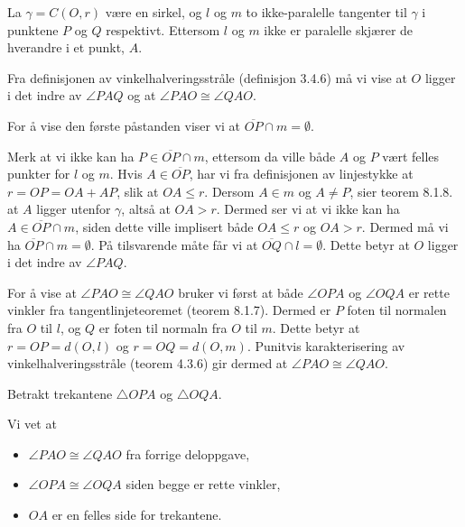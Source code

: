 \begin{oppgave}[8.1.6]
    La $\gamma=C(O,r)$ være en sirkel, og $l$ og $m$ to ikke-paralelle tangenter til $\gamma$ i punktene $P$ og $Q$ respektivt. 
    Ettersom $l$ og $m$ ikke er paralelle skjærer de hverandre i et punkt, $A$. 

    \begin{punkt}
        Fra definisjonen av vinkelhalveringsstråle (definisjon 3.4.6) må vi vise at $O$ ligger i det indre av $\angle PAQ$ og at $\angle PAO \cong \angle QAO$. 
        \begin{figure}[H]
            \centering
             
        \end{figure}
        For å vise den første påstanden viser vi at $\overline{OP}\cap m = \emptyset$. 

        Merk at vi ikke kan ha $P\in \overline{OP}\cap m$, ettersom da ville både $A$ og $P$ vært felles punkter for $l$ og $m$. 
        Hvis $A\in \overline{OP}$, har vi fra definisjonen av linjestykke at $r=OP=OA+AP$, slik at $OA\leq r$. 
        Dersom $A\in m$ og $A\neq P$, sier teorem 8.1.8. at $A$ ligger utenfor $\gamma$, altså at $OA > r$. 
        Dermed ser vi at vi ikke kan ha $A\in \overline{OP}\cap m$, siden dette ville implisert både $OA\leq r$ og $OA>r$. 
        Dermed må vi ha $\overline{OP}\cap m = \emptyset$. 
        På tilsvarende måte får vi at $\overline{OQ}\cap l=\emptyset$. 
        Dette betyr at $O$ ligger i det indre av $\angle PAQ$. 

        For å vise at $\angle PAO\cong \angle QAO$ bruker vi først at både $\angle OPA$ og $\angle OQA$ er rette vinkler fra tangentlinjeteoremet (teorem 8.1.7). 
        Dermed er $P$ foten til normalen fra $O$ til $l$, og $Q$ er foten til normaln fra $O$ til $m$. 
        Dette betyr at $r=OP=d(O,l)$ og $r=OQ=d(O,m)$. 
        Punitvis karakterisering av vinkelhalveringsstråle (teorem 4.3.6) gir dermed at $\angle PAO\cong \angle QAO$. 


    \end{punkt}

    \begin{punkt}
        Betrakt trekantene $\triangle OPA$ og $\triangle OQA$.
        \begin{figure}[H]
            \centering
             
        \end{figure}
        Vi vet at 
        \begin{itemize}
            \item $\angle PAO\cong \angle QAO$ fra forrige deloppgave,
            \item $\angle OPA\cong \angle OQA$ siden begge er rette vinkler,
            \item $OA$ er en felles side for trekantene. 
        \end{itemize}


\end{punkt}
\end{oppgave}
